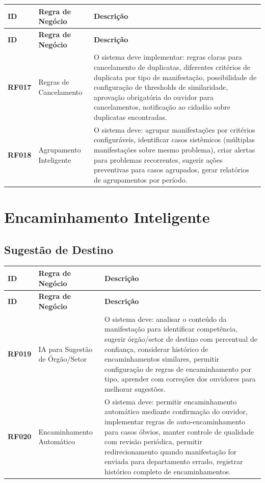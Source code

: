 \documentclass[12pt,a4paper]{article}
\newcommand{\rf}[1]{\textbf{\color{primaryblue}RF#1}}
\begin{document}
\begin{longtable}{|p{2cm}|p{5cm}|p{8cm}|}
\hline
\textbf{ID} & \textbf{Regra de Negócio} & \textbf{Descrição} \\
\hline
\endfirsthead
\hline
\textbf{ID} & \textbf{Regra de Negócio} & \textbf{Descrição} \\
\hline
\endhead

\rf{017} & Regras de Cancelamento & O sistema deve implementar: regras claras para cancelamento de duplicatas, diferentes critérios de duplicata por tipo de manifestação, possibilidade de configuração de thresholds de similaridade, aprovação obrigatória do ouvidor para cancelamentos, notificação ao cidadão sobre duplicatas encontradas. \\
\hline

\rf{018} & Agrupamento Inteligente & O sistema deve: agrupar manifestações por critérios configuráveis, identificar casos sistêmicos (múltiplas manifestações sobre mesmo problema), criar alertas para problemas recorrentes, sugerir ações preventivas para casos agrupados, gerar relatórios de agrupamentos por período. \\
\hline

\end{longtable}

\section{Encaminhamento Inteligente}

\subsection{Sugestão de Destino}

\begin{longtable}{|p{2cm}|p{5cm}|p{8cm}|}
\hline
\textbf{ID} & \textbf{Regra de Negócio} & \textbf{Descrição} \\
\hline
\endfirsthead
\hline
\textbf{ID} & \textbf{Regra de Negócio} & \textbf{Descrição} \\
\hline
\endhead

\rf{019} & IA para Sugestão de Órgão/Setor & O sistema deve: analisar o conteúdo da manifestação para identificar competência, sugerir órgão/setor de destino com percentual de confiança, considerar histórico de encaminhamentos similares, permitir configuração de regras de encaminhamento por tipo, aprender com correções dos ouvidores para melhorar sugestões. \\
\hline

\rf{020} & Encaminhamento Automático & O sistema deve: permitir encaminhamento automático mediante confirmação do ouvidor, implementar regras de auto-encaminhamento para casos óbvios, manter controle de qualidade com revisão periódica, permitir redirecionamento quando manifestação for enviada para departamento errado, registrar histórico completo de encaminhamentos. \\
\hline

\end{longtable}
\end{document}
